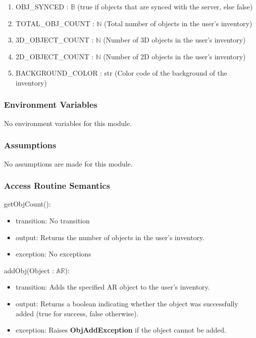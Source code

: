 \documentclass[12pt, titlepage]{article}
\begin{document}
\begin{enumerate}
  \item OBJ\_SYNCED : $\mathbb{B}$ (true if objects that are synced with the server, else false)
  \item TOTAL\_OBJ\_COUNT : $\mathbb{N}$ (Total number of objects in the user's inventory)
  \item 3D\_OBJECT\_COUNT : $\mathbb{N}$ (Number of 3D objects in the user's inventory)
  \item 2D\_OBJECT\_COUNT : $\mathbb{N}$ (Number of 2D objects in the user's inventory)
  \item BACKGROUND\_COLOR : str (Color code of the background of the inventory)
\end{enumerate}

\subsubsection{Environment Variables}

No environment variables for this module.

\subsubsection{Assumptions}

No assumptions are made for this module.

\subsubsection{Access Routine Semantics}

\noindent getObjCount():
\begin{itemize}
\item transition: No transition
\item output: Returns the number of objects in the user's inventory.
\item exception: No exceptions
\end{itemize}

\noindent addObj(Object : $\mathbb{AR}$):
\begin{itemize}
\item transition: Adds the specified AR object to the user's inventory.
\item output: Returns a boolean indicating whether the object was successfully added (true for success, false otherwise).
\item exception: Raises \textbf{ObjAddException} if the object cannot be added.
\end{itemize}
\end{document}
